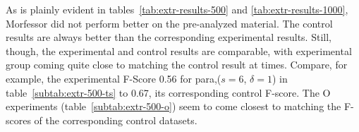 {	As is plainly evident in tables~\ref{tab:extr-results-500} and \ref{tab:extr-results-1000}, Morfessor did not perform 
	better on the pre-analyzed material. The control results are always better than the corresponding 
	experimental results. Still, though, the experimental and control results are comparable, with 
	experimental group coming quite close to matching the control result at times. Compare, for 
	example, the experimental F-Score 0.56 for para,($s=6$, $\delta=1$) in table~\ref{subtab:extr-500-ts} 
	to 0.67, its corresponding control F-score. The O experiments (table~\ref{subtab:extr-500-o}) seem 
	to come closest to matching the F-scores of the corresponding control datasets.
%
%
%
}
